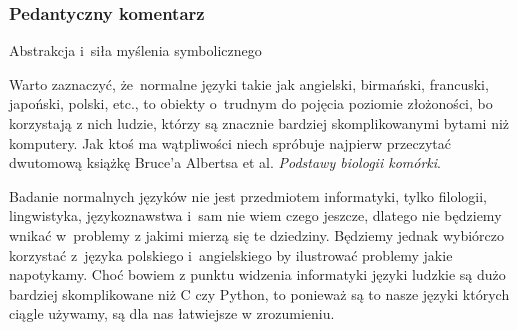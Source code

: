 \documentclass[10pt,t]{beamer}
\begin{document}
\begin{frame}
  \frametitle{Pedantyczny komentarz}

  Abstrakcja i~siła myślenia symbolicznego


  Warto zaznaczyć, że~normalne języki takie jak angielski, birmański,
  francuski, japoński, polski, etc., to obiekty o~trudnym do pojęcia
  poziomie złożoności, bo korzystają z nich ludzie, którzy są znacznie
  bardziej skomplikowanymi bytami niż komputery. Jak ktoś ma wątpliwości
  niech spróbuje najpierw przeczytać dwutomową książkę Bruce’a Albertsa
  et al. \textit{Podstawy biologii komórki}.

  Badanie normalnych języków nie jest przedmiotem informatyki, tylko
  filologii, lingwistyka, językoznawstwa i~sam nie wiem czego jeszcze,
  dlatego nie będziemy wnikać w~problemy z jakimi mierzą się te dziedziny.
  Będziemy jednak wybiórczo korzystać
  z~języka polskiego i~angielskiego by ilustrować problemy jakie napotykamy.
  Choć bowiem z punktu widzenia informatyki języki ludzkie są dużo bardziej
  skomplikowane niż C czy Python, to ponieważ są to \alert{nasze} języki
  których ciągle używamy, są dla nas łatwiejsze w zrozumieniu.


\end{frame}












\end{document}
